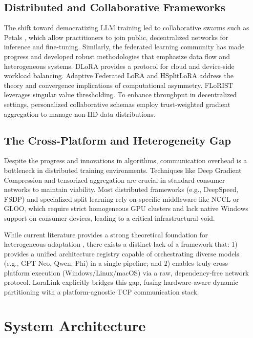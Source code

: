 \documentclass{ieeeaccess}
\begin{document}
\subsection{Distributed and Collaborative Frameworks}
The shift toward democratizing LLM training led to collaborative swarms such as Petals \cite{borzunov2023petals}, which allow practitioners to join public, decentralized networks for inference and fine-tuning. Similarly, the federated learning community has made progress and developed robust methodologies that emphasize data flow and heterogeneous systems. DLoRA \cite{gao2024dlora} provides a protocol for cloud and device-side workload balancing. Adaptive Federated LoRA \cite{hou2025adaptive} and HSplitLoRA \cite{lin2025hsplitlora} address the theory and convergence implications of computational asymmetry. FLoRIST \cite{ramesh2025florist} leverages singular value thresholding. To enhance throughput in decentralized settings, personalized collaborative schemas \cite{wagner2024personalized} employ trust-weighted gradient aggregation to manage non-IID data distributions.

\subsection{The Cross-Platform and Heterogeneity Gap}
Despite the progress and innovations in algorithms, communication overhead is a bottleneck in distributed training environments. Techniques like Deep Gradient Compression \cite{lin2018deep} and tensorized aggregation \cite{ghiasvand2024communication} are crucial in standard consumer networks to maintain viability. Most distributed frameworks (e.g., DeepSpeed, FSDP) and specialized split learning rely on specific middleware like NCCL or GLOO, which require strict homogeneous GPU clusters and lack native Windows support on consumer devices, leading to a critical infrastructural void.

While current literature provides a strong theoretical foundation for heterogeneous adaptation \cite{lin2025hsplitlora}, there exists a distinct lack of a framework that: 1) provides a unified architecture registry capable of orchestrating diverse models (e.g., GPT-Neo, Qwen, Phi) in a single pipeline; and 2) enables truly cross-platform execution (Windows/Linux/macOS) via a raw, dependency-free network protocol. LoraLink explicitly bridges this gap, fusing hardware-aware dynamic partitioning with a platform-agnostic TCP communication stack.

\section{System Architecture}
\end{document}
